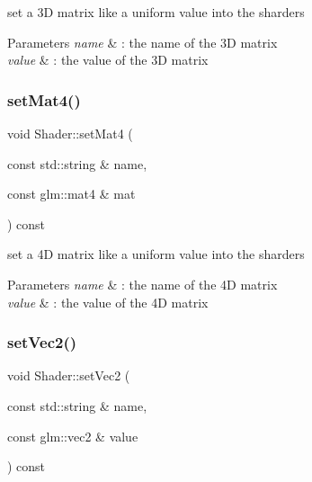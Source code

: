 set a 3D matrix like a uniform value into the sharders 


\begin{DoxyParams}{Parameters}
{\em name} & \+: the name of the 3D matrix \\
\hline
{\em value} & \+: the value of the 3D matrix \\
\hline
\end{DoxyParams}
\mbox{\label{class_shader_a8e711c96f3e1722cbfb88fde9478977c}} 
\subsubsection{\texorpdfstring{set\+Mat4()}{setMat4()}}
{\footnotesize\ttfamily void Shader\+::set\+Mat4 (\begin{DoxyParamCaption}\item[{const std\+::string \&}]{name,  }\item[{const glm\+::mat4 \&}]{mat }\end{DoxyParamCaption}) const}



set a 4D matrix like a uniform value into the sharders 


\begin{DoxyParams}{Parameters}
{\em name} & \+: the name of the 4D matrix \\
\hline
{\em value} & \+: the value of the 4D matrix \\
\hline
\end{DoxyParams}
\mbox{\label{class_shader_afd4d41322a1cdd1d5155bf124d19debf}} 
\subsubsection{\texorpdfstring{set\+Vec2()}{setVec2()}\hspace{0.1cm}{\footnotesize\ttfamily [1/2]}}
{\footnotesize\ttfamily void Shader\+::set\+Vec2 (\begin{DoxyParamCaption}\item[{const std\+::string \&}]{name,  }\item[{const glm\+::vec2 \&}]{value }\end{DoxyParamCaption}) const}




